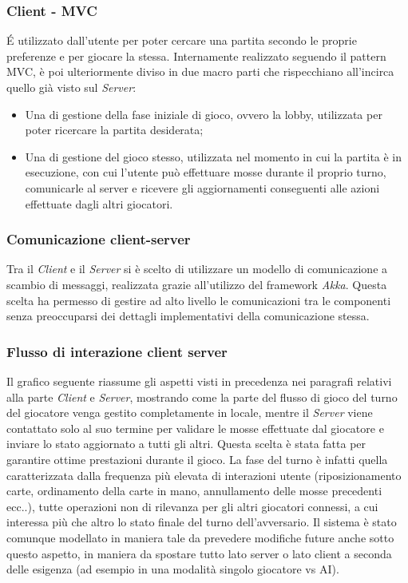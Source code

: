 \subsubsection{Client - MVC}
É utilizzato dall’utente per poter cercare una partita secondo le proprie preferenze e per giocare la stessa.
Internamente realizzato seguendo il pattern MVC, è poi ulteriormente diviso in due macro parti che rispecchiano all’incirca quello già visto sul \textit{Server}:
\begin{itemize}
    \item Una di gestione della fase iniziale di gioco, ovvero la lobby, utilizzata per poter ricercare la partita desiderata;
    \item Una di gestione del gioco stesso, utilizzata nel momento in cui la partita è in esecuzione, con cui l’utente può effettuare mosse durante il proprio turno, comunicarle al server e ricevere gli aggiornamenti conseguenti alle azioni effettuate dagli altri giocatori.
\end{itemize}

\subsubsection{Comunicazione client-server}
Tra il \textit{Client} e il \textit{Server} si è scelto di utilizzare un modello di comunicazione a scambio di messaggi, realizzata grazie all’utilizzo del framework \textit{Akka}.
Questa scelta ha permesso di gestire ad alto livello le comunicazioni tra le componenti senza preoccuparsi dei dettagli implementativi della comunicazione stessa.

\subsubsection[Flussi di interazione]{Flusso di interazione client server}
Il grafico seguente riassume gli aspetti visti in precedenza nei paragrafi relativi alla parte \textit{Client} e \textit{Server}, mostrando come la parte del flusso di gioco del turno del giocatore venga gestito completamente in locale, mentre il \textit{Server} viene contattato solo al suo termine per validare le mosse effettuate dal giocatore e inviare lo stato aggiornato a tutti gli altri.
Questa scelta è stata fatta per garantire ottime prestazioni durante il gioco.
La fase del turno è infatti quella caratterizzata dalla frequenza più elevata di interazioni utente (riposizionamento carte, ordinamento della carte in mano, annullamento delle mosse precedenti ecc..), tutte operazioni non di rilevanza per gli altri giocatori connessi, a cui interessa più che altro lo stato finale del turno dell’avversario.
Il sistema è stato comunque modellato in maniera tale da prevedere modifiche future anche sotto questo aspetto, in maniera da spostare tutto lato server o lato client a seconda delle esigenza (ad esempio in una modalità singolo giocatore vs AI).

\newpage